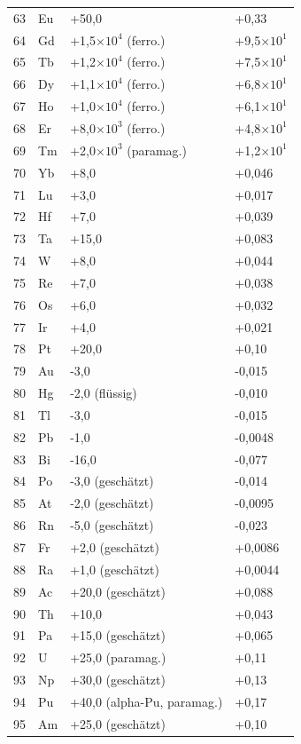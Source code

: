 \documentclass[12pt,a4paper]{article}
\begin{document}
\begin{longtable}{p{0.6cm}p{1.2cm}p{2.5cm}p{2.5cm}}
		63 & Eu & +50,0 & +0,33 \\
		64 & Gd & +1,5\(\times10^4\) (ferro.) & +9,5\(\times10^1\) \\
		65 & Tb & +1,2\(\times10^4\) (ferro.) & +7,5\(\times10^1\) \\
		66 & Dy & +1,1\(\times10^4\) (ferro.) & +6,8\(\times10^1\) \\
		67 & Ho & +1,0\(\times10^4\) (ferro.) & +6,1\(\times10^1\) \\
		68 & Er & +8,0\(\times10^3\) (ferro.) & +4,8\(\times10^1\) \\
		69 & Tm & +2,0\(\times10^3\) (paramag.) & +1,2\(\times10^1\) \\
		70 & Yb & +8,0 & +0,046 \\
		71 & Lu & +3,0 & +0,017 \\
		72 & Hf & +7,0 & +0,039 \\
		73 & Ta & +15,0 & +0,083 \\
		74 & W  & +8,0 & +0,044 \\
		75 & Re & +7,0 & +0,038 \\
		76 & Os & +6,0 & +0,032 \\
		77 & Ir & +4,0 & +0,021 \\
		78 & Pt & +20,0 & +0,10 \\
		79 & Au & -3,0 & -0,015 \\
		80 & Hg & -2,0 (flüssig) & -0,010 \\
		81 & Tl & -3,0 & -0,015 \\
		82 & Pb & -1,0 & -0,0048 \\
		83 & Bi & -16,0 & -0,077 \\
		84 & Po & -3,0 (geschätzt) & -0,014 \\
		85 & At & -2,0 (geschätzt) & -0,0095 \\
		86 & Rn & -5,0 (geschätzt) & -0,023 \\
		87 & Fr & +2,0 (geschätzt) & +0,0086 \\
		88 & Ra & +1,0 (geschätzt) & +0,0044 \\
		89 & Ac & +20,0 (geschätzt) & +0,088 \\
		90 & Th & +10,0 & +0,043 \\
		91 & Pa & +15,0 (geschätzt) & +0,065 \\
		92 & U  & +25,0 (paramag.) & +0,11 \\
		93 & Np & +30,0 (geschätzt) & +0,13 \\
		94 & Pu & +40,0 (alpha-Pu, paramag.) & +0,17 \\
		95 & Am & +25,0 (geschätzt) & +0,10 \\

\end{longtable}
\end{document}
